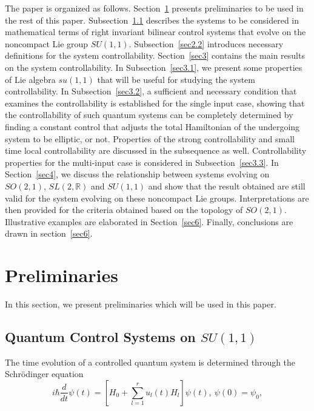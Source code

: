 \documentclass[onecolumn,showpacs,showkeys,preprintnumbers]{revtex4}
\begin{document}
The paper is organized as follows. Section~\ref{sec2} presents
preliminaries to be used in the rest of this paper.
Subsection~\ref{sec2.1} describes the systems to be considered in
mathematical terms of right invariant bilinear control systems
that evolve on the noncompact Lie group $SU(1,1)$.
Subsection~\ref{sec2.2} introduces necessary definitions for the
system controllability. Section~\ref{sec3} contains the main
results on the system controllability. In Subsection~\ref{sec3.1},
we present some properties of Lie algebra $su(1,1)$ that will be
useful for studying the system controllability. In
Subsection~\ref{sec3.2}, a sufficient and necessary condition that
examines the controllability is established for the single input
case, showing that the controllability of such quantum systems can
be completely determined by finding a constant control that
adjusts the total Hamiltonian of the undergoing system to be
elliptic, or not. Properties of the strong controllability and
small time local controllability are discussed in the subsequence
as well. Controllability properties for the multi-input case is
considered in Subsection~\ref{sec3.3}. In Section~\ref{sec4}, we
discuss the relationship between systems evolving on $SO(2,1)$,
$SL(2,\mathbb{R})$ and $SU(1,1)$ and show that the result obtained
are still valid for the system evolving on these noncompact Lie
groups. Interpretations are then provided for the criteria
obtained based on the topology of $SO(2,1)$. Illustrative examples
are elaborated in Section~\ref{sec6}. Finally, conclusions are
drawn in section~\ref{sec6}.

\section{Preliminaries}\label{sec2}

In this section, we present preliminaries which will be used in
this paper.

\subsection{Quantum Control Systems on $SU(1,1)$}\label{sec2.1}

The time evolution of a controlled quantum system is determined
through the Schr\"{o}dinger equation\begin{equation}\label{eq2.1.1}
i\hbar\frac{d}{dt}\psi(t)=\left[H_0+\sum_{l=1}^{r}u_l(t)H_l\right]\psi(t),~\psi(0)=\psi_0,
\end{equation}
\end{document}
